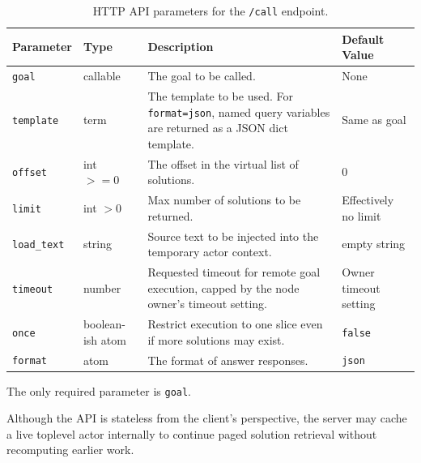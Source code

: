 \begin{table}[h!]
\centering
\begin{tabular}{| m{1.5cm} | m{1.2cm} | m{5.7cm} | m{2.6cm} |}
\hline
\textbf{Parameter} & \textbf{Type} & \textbf{Description} & \textbf{Default Value} \\
\hline
\texttt{goal} & callable & The goal to be called. & None \\
\hline
\texttt{template} & term & The template to be used. For \texttt{format=json}, named query variables are returned as a JSON dict template. & Same as goal \\
\hline
\texttt{offset} & int $>= 0$ & The offset in the virtual list of solutions. & 0 \\
\hline
\texttt{limit} & int $> 0$ & Max number of solutions to be returned. & Effectively no limit \\
\hline
\texttt{load\_text} & string & Source text to be injected into the temporary actor context. & empty string \\
\hline
\texttt{timeout} & number & Requested timeout for remote goal execution, capped by the node owner's timeout setting. & Owner timeout setting \\
\hline
\texttt{once} & boolean-ish atom & Restrict execution to one slice even if more solutions may exist. & \texttt{false} \\
\hline
\texttt{format} & atom & The format of answer responses. & \texttt{json} \\
\hline
\end{tabular}
\caption{HTTP API parameters for the \texttt{/call} endpoint.}
\label{table:api-parameters-call-stateless}
\end{table}

\noindent The only required parameter is \texttt{goal}.

\smallskip
\noindent Although the API is stateless from the client's perspective, the
server may cache a live toplevel actor internally to continue paged solution
retrieval without recomputing earlier work.\\
